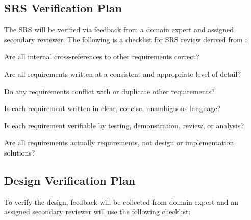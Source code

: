 \documentclass[12pt, titlepage]{article}
\begin{document}



\subsection{SRS Verification Plan}

The SRS \citep{SRS} will be verified via feedback from a domain expert and assigned secondary
reviewer. The following is a checklist for SRS review derived from \citep{wiegers2002peer}:

\begin{todolist}
    \item Are all internal cross-references to other requirements correct?
    \item Are all requirements written at a consistent and appropriate level of detail?
    \item Do any requirements conflict with or duplicate other requirements?
    \item Is each requirement written in clear, concise, unambiguous language?
    \item Is each requirement verifiable by testing, demonstration, review, or analysis?
    \item Are all requirements actually requirements, not design or implementation solutions?
\end{todolist}




\subsection{Design Verification Plan}

To verify the design, feedback will be collected from domain expert and an assigned secondary
reviewer will use the following checklist:
\end{document}
